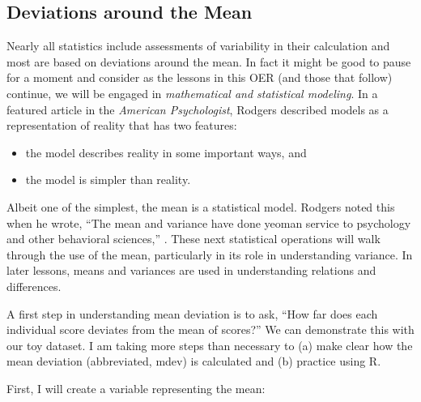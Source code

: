 \documentclass[
  11pt,
]{book}
\newenvironment{Shaded}{\begin{snugshade}}{\end{snugshade}}
\newcommand{\AttributeTok}[1]{\textcolor[rgb]{0.77,0.63,0.00}{#1}}
\newcommand{\CommentTok}[1]{\textcolor[rgb]{0.56,0.35,0.01}{\textit{#1}}}
\newcommand{\ConstantTok}[1]{\textcolor[rgb]{0.00,0.00,0.00}{#1}}
\newcommand{\FunctionTok}[1]{\textcolor[rgb]{0.00,0.00,0.00}{#1}}
\newcommand{\NormalTok}[1]{#1}
\newcommand{\OtherTok}[1]{\textcolor[rgb]{0.56,0.35,0.01}{#1}}
\newcommand{\SpecialCharTok}[1]{\textcolor[rgb]{0.00,0.00,0.00}{#1}}
\providecommand{\tightlist}{%
  \setlength{\itemsep}{0pt}\setlength{\parskip}{0pt}}
\begin{document}
\hypertarget{deviations-around-the-mean}{%
\subsection{Deviations around the Mean}\label{deviations-around-the-mean}}

Nearly all statistics include assessments of variability in their calculation and most are based on deviations around the mean. In fact it might be good to pause for a moment and consider as the lessons in this OER (and those that follow) continue, we will be engaged in \emph{mathematical and statistical modeling}. In a featured article in the \emph{American Psychologist}, Rodgers \citeyearpar{rodgers_epistemology_2010} described models as a representation of reality that has two features:

\begin{itemize}
\tightlist
\item
  the model describes reality in some important ways, and
\item
  the model is simpler than reality.
\end{itemize}

Albeit one of the simplest, the mean is a statistical model. Rodgers noted this when he wrote, ``The mean and variance have done yeoman service to psychology and other behavioral sciences,'' \citeyearpar[p.~4]{rodgers_epistemology_2010}. These next statistical operations will walk through the use of the mean, particularly in its role in understanding variance. In later lessons, means and variances are used in understanding relations and differences.

A first step in understanding mean deviation is to ask, ``How far does each individual score deviates from the mean of scores?'' We can demonstrate this with our toy dataset. I am taking more steps than necessary to (a) make clear how the mean deviation (abbreviated, mdev) is calculated and (b) practice using R.

First, I will create a variable representing the mean:

\begin{Shaded}
\end{Shaded}
\end{document}
